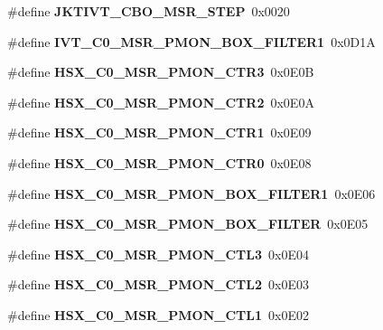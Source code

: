 \begin{DoxyCompactItemize}
\item 
\#define {\bfseries J\+K\+T\+I\+V\+T\+\_\+\+C\+B\+O\+\_\+\+M\+S\+R\+\_\+\+S\+T\+EP}~0x0020\label{types_8h_a069253dac5f3da55d4814e91b888f67f}

\item 
\#define {\bfseries I\+V\+T\+\_\+\+C0\+\_\+\+M\+S\+R\+\_\+\+P\+M\+O\+N\+\_\+\+B\+O\+X\+\_\+\+F\+I\+L\+T\+E\+R1}~0x0\+D1A\label{types_8h_af8b5eb92ad5d6fb3f03130c201c60860}

\item 
\#define {\bfseries H\+S\+X\+\_\+\+C0\+\_\+\+M\+S\+R\+\_\+\+P\+M\+O\+N\+\_\+\+C\+T\+R3}~0x0\+E0B\label{types_8h_afc5237039c59a0783dbc709ebecd69dc}

\item 
\#define {\bfseries H\+S\+X\+\_\+\+C0\+\_\+\+M\+S\+R\+\_\+\+P\+M\+O\+N\+\_\+\+C\+T\+R2}~0x0\+E0A\label{types_8h_a3ad5497dcf2c7d89d504ef40bb8366e3}

\item 
\#define {\bfseries H\+S\+X\+\_\+\+C0\+\_\+\+M\+S\+R\+\_\+\+P\+M\+O\+N\+\_\+\+C\+T\+R1}~0x0\+E09\label{types_8h_a7fb1b10f629451ddd7afb4349f4d3ca8}

\item 
\#define {\bfseries H\+S\+X\+\_\+\+C0\+\_\+\+M\+S\+R\+\_\+\+P\+M\+O\+N\+\_\+\+C\+T\+R0}~0x0\+E08\label{types_8h_a039985ea2576189280f6699430c7b868}

\item 
\#define {\bfseries H\+S\+X\+\_\+\+C0\+\_\+\+M\+S\+R\+\_\+\+P\+M\+O\+N\+\_\+\+B\+O\+X\+\_\+\+F\+I\+L\+T\+E\+R1}~0x0\+E06\label{types_8h_a41a862718755cf090930ea2e70c4bc73}

\item 
\#define {\bfseries H\+S\+X\+\_\+\+C0\+\_\+\+M\+S\+R\+\_\+\+P\+M\+O\+N\+\_\+\+B\+O\+X\+\_\+\+F\+I\+L\+T\+ER}~0x0\+E05\label{types_8h_afb645148c0bc53f930c261beb89d8917}

\item 
\#define {\bfseries H\+S\+X\+\_\+\+C0\+\_\+\+M\+S\+R\+\_\+\+P\+M\+O\+N\+\_\+\+C\+T\+L3}~0x0\+E04\label{types_8h_a0e187286b4065a99c163b16148ec55c8}

\item 
\#define {\bfseries H\+S\+X\+\_\+\+C0\+\_\+\+M\+S\+R\+\_\+\+P\+M\+O\+N\+\_\+\+C\+T\+L2}~0x0\+E03\label{types_8h_a04832897a121e2f5b41ca838167f1292}

\item 
\#define {\bfseries H\+S\+X\+\_\+\+C0\+\_\+\+M\+S\+R\+\_\+\+P\+M\+O\+N\+\_\+\+C\+T\+L1}~0x0\+E02\label{types_8h_a3b5551679911d1aeae997f8ef7301cb9}


\end{DoxyCompactItemize}
